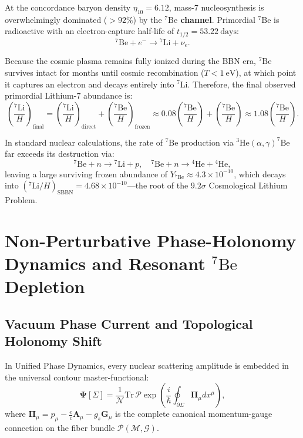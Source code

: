 \documentclass[11pt, a4paper]{article}
\theoremstyle{definition}
\theoremstyle{remark}
\begin{document}
At the concordance baryon density $\eta_{10} = 6.12$, mass-7 nucleosynthesis is overwhelmingly dominated ($> 92\%$) by the \textbf{$^7\mathrm{Be}$ channel}. Primordial $^7\mathrm{Be}$ is radioactive with an electron-capture half-life of $t_{1/2} = 53.22~\mathrm{days}$:
\begin{equation}
  {}^7\mathrm{Be} + e^- \longrightarrow {}^7\mathrm{Li} + \nu_e.
\end{equation}

Because the cosmic plasma remains fully ionized during the BBN era, $^7\mathrm{Be}$ survives intact for months until cosmic recombination ($T < 1~\mathrm{eV}$), at which point it captures an electron and decays entirely into $^7\mathrm{Li}$. Therefore, the final observed primordial Lithium-7 abundance is:
\begin{equation}
  \left(\frac{^7\mathrm{Li}}{H}\right)_{\mathrm{final}} = \left(\frac{^7\mathrm{Li}}{H}\right)_{\mathrm{direct}} + \left(\frac{^7\mathrm{Be}}{H}\right)_{\mathrm{frozen}} \approx 0.08 \left(\frac{^7\mathrm{Be}}{H}\right) + \left(\frac{^7\mathrm{Be}}{H}\right) \approx 1.08 \left(\frac{^7\mathrm{Be}}{H}\right).
\end{equation}

In standard nuclear calculations, the rate of $^7\mathrm{Be}$ production via $^3\mathrm{He}(\alpha, \gamma)^7\mathrm{Be}$ far exceeds its destruction via:
\begin{equation}
  {}^7\mathrm{Be} + n \longrightarrow {}^7\mathrm{Li} + p, \quad {}^7\mathrm{Be} + n \longrightarrow {}^4\mathrm{He} + {}^4\mathrm{He},
\end{equation}
leaving a large surviving frozen abundance of $Y_{^7\mathrm{Be}} \approx 4.3 \times 10^{-10}$, which decays into $(^7\mathrm{Li}/H)_{\mathrm{SBBN}} = 4.68 \times 10^{-10}$---the root of the $9.2\sigma$ Cosmological Lithium Problem.

\section{Non-Perturbative Phase-Holonomy Dynamics and Resonant $^7\mathrm{Be}$ Depletion}

\subsection{Vacuum Phase Current and Topological Holonomy Shift}
In Unified Phase Dynamics, every nuclear scattering amplitude is embedded in the universal contour master-functional:
\begin{equation}
  \mathbf{\Psi}[\Sigma] = \frac{1}{\mathcal{N}} \mathrm{Tr}\,\mathcal{P}\exp\left(\frac{i}{\hbar} \oint_{\partial \Sigma} \mathbf{\Pi}_\mu dx^\mu\right),
\end{equation}
where $\mathbf{\Pi}_\mu = p_\mu - \frac{e}{c} \mathbf{A}_\mu - g_s \mathbf{G}_\mu$ is the complete canonical momentum-gauge connection on the fiber bundle $\mathcal{P}(\mathcal{M}, \mathcal{G})$.
\end{document}
